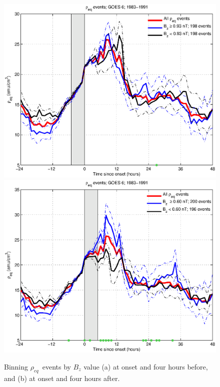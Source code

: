 \documentclass[10pt,twocolumn]{article}
\newcommand{\req}{\ensuremath{\rho_{eq}}}
\begin{document}
\begin{figure}[tp!]
	\centering
	\includegraphics[scale=0.40]{paperfigures/RhoBinnedBz-case24-t020-tf25-GOES6.eps}
	\includegraphics[scale=0.40]{paperfigures/RhoBinnedBz-case24-t025-tf30-GOES6.eps}
	\caption{Binning \req\ events by $B_z$ value (a) at onset and four hours before, and (b) at onset and four hours after.}
	\label{fig:RhoBinned}
\end{figure}

\clearpage
\end{document}
